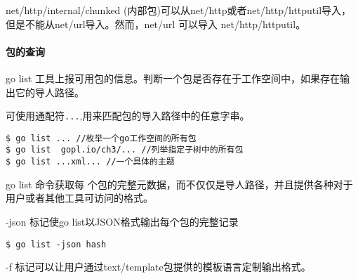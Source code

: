 net/http/internal/chunked
(内部包)可以从net/http或者net/http/httputil导入，但是不能从net/url导入。然而，net/url
可以导入 net/http/httputil。

\hypertarget{ux5305ux7684ux67e5ux8be2}{%
\paragraph{包的查询}\label{ux5305ux7684ux67e5ux8be2}}

go list
工具上报可用包的信息。判断一个包是否存在于工作空间中，如果存在输出它的导人路径。

可使用通配符\texttt{...},用来匹配包的导入路径中的任意字串。

\begin{verbatim}
$ go list ... //枚举一个go工作空间的所有包
$ go list  gopl.io/ch3/... //列举指定子树中的所有包
$ go list ...xml... //一个具体的主题
\end{verbatim}

go list 命令获取每
个包的完整元数据，而不仅仅是导人路径，并且提供各种对于用户或者其他工具可访问的格式。

-json 标记使go list以JSON格式输出每个包的完整记录

\begin{verbatim}
$ go list -json hash
\end{verbatim}

-f 标记可以让用户通过text/template包提供的模板语言定制输出格式。
